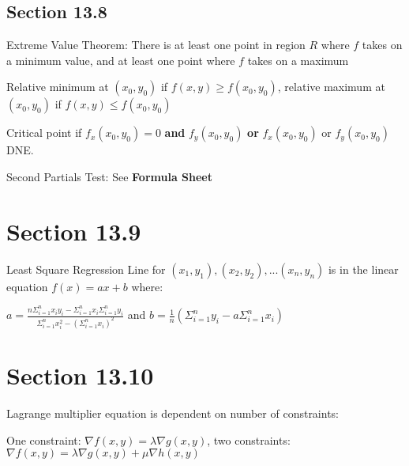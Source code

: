 \documentclass{article}
\begin{document}
\subsection{Section 13.8}
\par\noindent\large Extreme Value Theorem: There is at least one point in region $R$ where $f$ takes on a minimum value, and at least one point where $f$ takes on a maximum
\par\noindent\large Relative minimum at $(x_{0}, y_{0})$ if $f(x, y) \geq f(x_{0}, y_{0})$, relative maximum at $(x_{0}, y_{0})$ if $f(x, y) \leq f(x_{0}, y_{0})$\vspace{0.25cm}

\par\noindent\large Critical point if $f_{x}(x_{0}, y_{0}) = 0$ \textbf{and} $f_{y}(x_{0}, y_{0})$ \textbf{or} $f_{x}(x_{0}, y_{0})$ or $f_{y}(x_{0}, y_{0})$ DNE.\vspace{0.25cm}

\par\noindent\large Second Partials Test: See \textbf{Formula Sheet}

\section{Section 13.9}
\par\noindent\large Least Square Regression Line for ${(x_{1}, y_{1}), (x_{2}, y_{2}), ... (x_{n}, y_{n})}$ is in the linear equation $f(x) = ax + b$ where:
\par\noindent\huge $a = \frac{n\Sigma_{i = 1}^{n}x_{i}y_{i} - \Sigma_{i = 1}^{n}x_{i}\Sigma_{i = 1}^{n}y_{i}}{\Sigma_{i = 1}^{n}x_{i}^{2} - (\Sigma_{i = 1}^{n}x_{i})^{2}}$ and $b = \frac{1}{n}(\Sigma_{i = 1}^{n}y_{i} - a\Sigma_{i = 1}^{n}x_{i})$

\section{Section 13.10}
\par\noindent\large Lagrange multiplier equation is dependent on number of constraints:
\par\noindent\large One constraint: $\nabla f(x, y) = \lambda\nabla g(x, y)$, two constraints: $\nabla f(x, y) = \lambda\nabla g(x, y) + \mu\nabla h(x, y)$
\end{document}
